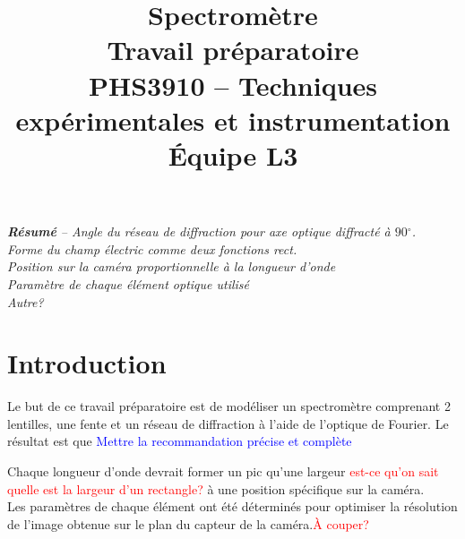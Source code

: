 \documentclass[conference]{IEEEtran}
\begin{document}
\title{Spectromètre\\
\large Travail préparatoire \\
PHS3910 -- Techniques expérimentales et instrumentation\\ 
Équipe L3}

\author{
\and
{}
\and
{}
\and
{}
}

\maketitle

\textit{\textbf{Résumé} -- Angle du réseau de diffraction pour axe optique diffracté à $90{^\circ}$.\\
Forme du champ électric comme deux fonctions rect.\\
Position sur la caméra proportionnelle à la longueur d'onde\\
Paramètre de chaque élément optique utilisé\\
Autre?}



\section{Introduction}
Le but de ce travail préparatoire est de modéliser un spectromètre 
comprenant 2 lentilles, une fente et un réseau de diffraction à 
l'aide de l'optique de Fourier. 
Le résultat est que \textcolor{blue}{Mettre la recommandation précise et complète}

Chaque longueur d'onde devrait former un pic qu'une largeur \textcolor{red}{est-ce qu'on sait quelle est la largeur d'un rectangle?}
à une position spécifique sur la caméra. \\

Les paramètres de chaque élément ont été déterminés pour optimiser 
la résolution de l'image obtenue sur le plan du capteur de la caméra.\textcolor{red}{À couper?}
\end{document}
